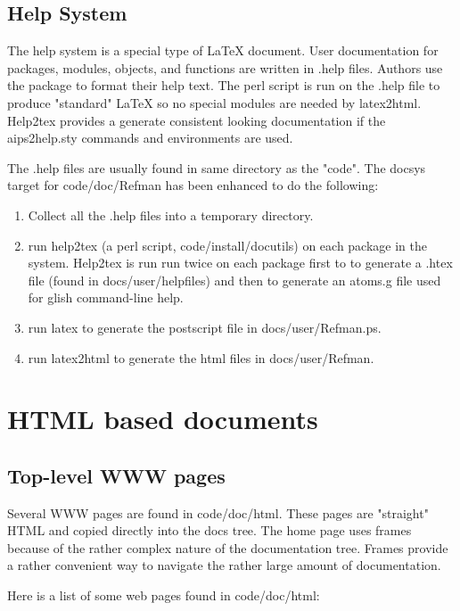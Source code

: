 \subsection{Help System}
The help system is a special type of LaTeX document.  User documentation for
packages, modules, objects, and functions are written in .help files.
Authors use the  package to format their
help text.  The perl script  is run on the
.help file to produce "standard" LaTeX so no special modules are needed by
latex2html.
Help2tex provides a generate consistent looking documentation if the
aips2help.sty commands and environments are used.

The .help files are usually found in same directory as the "code".
The docsys target for code/doc/Refman has been enhanced to do the following:
\begin{enumerate}
\item Collect all the .help files into a temporary directory.
\item run help2tex (a perl script, code/install/docutils) on each package in
the system. Help2tex is run run twice on each package first to to generate
a .htex file (found in docs/user/helpfiles) and then to generate an atoms.g
file used for glish command-line help.
\item run latex to generate the postscript file in docs/user/Refman.ps.
\item run latex2html to generate the html files in docs/user/Refman.
\end{enumerate}


\section{HTML based documents}
\subsection{Top-level WWW pages}
Several WWW pages are found in code/doc/html.  These pages are "straight" HTML
and copied directly into the docs tree.  The \aips home page uses frames because
of the rather complex nature of the documentation tree.  Frames provide a rather
convenient way to navigate the rather large amount of \aips documentation.

Here is a list of some \aips web pages found in code/doc/html:


